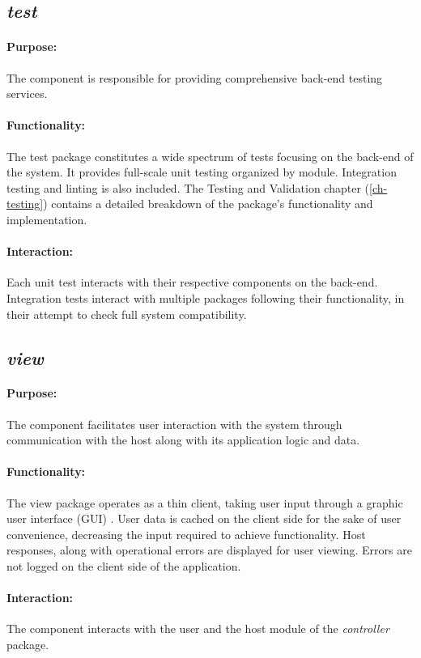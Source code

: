 \documentclass{thesis-ekf}
\theoremstyle{definition}
\theoremstyle{remark}
\begin{document}
{\subsection{\emph{test}}
\paragraph{Purpose:}
The component is responsible for providing comprehensive back-end testing services.
\paragraph{Functionality:}
The test package constitutes a wide spectrum of tests focusing on the back-end of the system. It provides full-scale unit testing organized by module. Integration testing and linting is also included. The Testing and Validation chapter (\ref{ch-testing}) contains a detailed breakdown of the package's functionality and implementation.
\paragraph{Interaction:}
Each unit test interacts with their respective components on the back-end. Integration tests interact with multiple packages following their functionality, in their attempt to check full system compatibility.

\subsection{\emph{view}}
\paragraph{Purpose:}
The component facilitates user interaction with the system through communication with the host along with its application logic and data.
\paragraph{Functionality:}
The view package operates as a thin client, taking user input through a graphic user interface (GUI) \cite{Wiki-GUI}. User data is cached on the client side for the sake of user convenience, decreasing the input required to achieve functionality. Host responses, along with operational errors are displayed for user viewing. Errors are not logged on the client side of the application.
\paragraph{Interaction:}
The component interacts with the user and the host module of the \emph{controller} package.

}
\end{document}
